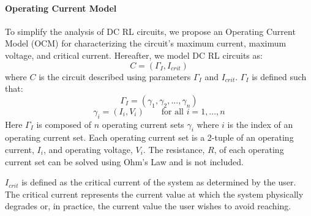 \paragraph{Operating Current Model}
To simplify the analysis of DC RL circuits, we propose an Operating Current Model (OCM) for characterizing the circuit's maximum current, maximum voltage, and critical current. Hereafter, we model DC RL circuits as:
\begin{equation}\label{eq:OCM}
C = (\Gamma_{I}, I_{crit})
\end{equation}
where $C$ is the circuit described using parameters $\Gamma_{I}$ and $I_{crit}$. $\Gamma_{I}$ is defined such that:
\begin{equation}\label{eq:OCMTuples}
\Gamma_{I} = (\gamma_{1},\gamma_{2},...,\gamma_{n})
\end{equation}
\begin{equation}\label{eq:OCMIVPairs}
\gamma_{i} = (I_{i},V_{i})\qquad\text{for all  } i=1,...,n
\end{equation}
Here $\Gamma_{I}$ is composed of $n$ operating current sets $\gamma_{i}$ where $i$ is the index of an operating current set. Each operating current set is a 2-tuple of an operating current, $I_{i}$, and operating voltage, $V_{i}$. The resistance, $R$, of each operating current set can be solved using Ohm's Law and is not included. 

$I_{crit}$ is defined as the critical current of the system as determined by the user. The critical current represents the current value at which the system physically degrades or, in practice, the current value the user wishes to avoid reaching.

